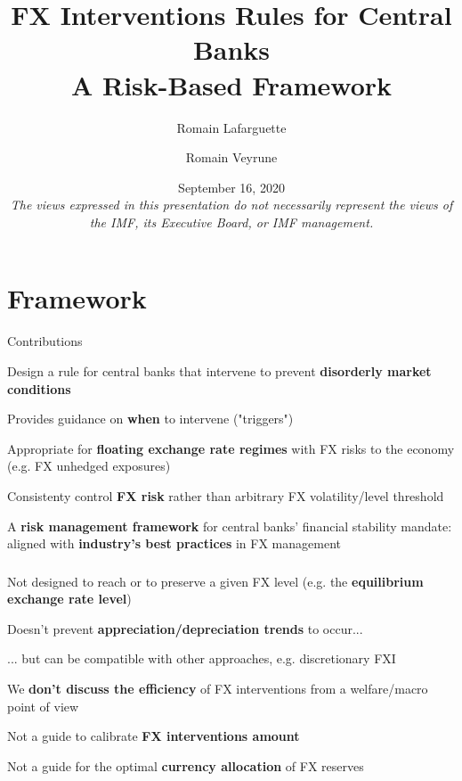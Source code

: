 \documentclass{beamer}
\title[]{FX Interventions Rules for Central Banks\\
A Risk-Based Framework}
\author[]{Romain Lafarguette \and Romain Veyrune}
\institute[]{IMF Monetary and Capital Markets Department \\ Central Bank Operations Division}
\date[]{\scriptsize September 16, 2020 \\ \vspace{0.5cm} \scriptsize{\textit{The views
      expressed in this presentation do not necessarily represent the views of
      the IMF, its Executive Board, or IMF management.}} \vspace{-0.3cm}}
\newenvironment{largeitemize}{\itemize\addtolength{\itemsep}{10pt}}{\enditemize}
\begin{document}
\begingroup
\renewcommand{\insertframenumber}{}
\begin{frame}
\maketitle
\end{frame}
\endgroup


\section{Framework}

\begin{frame}{Contributions}

  \begin{largeitemize}
    \item Design a rule for central banks that intervene to prevent \textbf{disorderly
        market conditions}
    \item Provides guidance on \textbf{when} to intervene ("triggers")
    \item Appropriate for \textbf{floating exchange rate regimes} with FX
      risks to the economy (e.g. FX unhedged exposures)
    \item Consistenty control \textbf{FX risk} rather than arbitrary FX volatility/level threshold
    \item A \textbf{risk management framework} for central banks' financial
      stability mandate: aligned with \textbf{industry's best practices} in FX management
  \end{largeitemize}
  
\end{frame}


\begin{frame}
  \frametitle{\color{red}{What the rule is NOT about}}
  \begin{alertblock}{}
    \begin{largeitemize}
    \item Not designed to reach or to preserve a given FX level
      (e.g. the \textbf{equilibrium exchange rate level})
    \item Doesn't prevent \textbf{appreciation/depreciation trends} to occur...
    \item ... but can be compatible with other approaches, e.g. discretionary FXI
    \item We \textbf{don't discuss the efficiency} of FX interventions from a
      welfare/macro point of view
    \item Not a guide to calibrate \textbf{FX interventions amount}
    \item Not a guide for the optimal \textbf{currency allocation} of FX reserves
    \end{largeitemize}
    
  \end{alertblock}
  
\end{frame}
\end{document}
